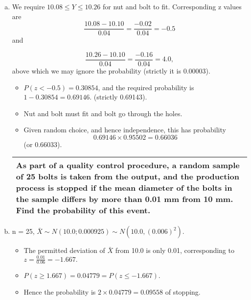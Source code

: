 \documentclass[a4paper,12pt]{article}
\begin{document}
\begin{enumerate}[(a)]
\begin{eqnarray*}
i.e. &=& P(z > \frac{-0.24}{0.12} ) \\
&=& P(z > -2:0) \\ 
&=& 0.97725.
\end{eqnarray*}
(a) Plates are independent, so required probability is (0.97725)2 = 0.95502.
\item We require $10.08 \leq Y \leq 10.26$ for nut and bolt to fit. Corresponding z values
are 
\[ \frac{10.08-10.10}{0.04} = \frac{ -0.02}{0.04} = -0.5 \]
and

\[ \frac{10.26-10.10}{0.04} = \frac{ -0.16}{0.04} = 4.0,\]
above which we
may ignore the probability (strictly it is 0.00003). 
\begin{itemize}
\item $P(z < -0.5) = 0.30854$,
and the required probability is $1 - 0.30854 = 0.69146.$ (strictly 0.69143).
\item Nut and bolt must fit and bolt go through the holes.
\item Given random choice,
and hence independence, this has probability \[0.69146 \times 0.95502 = 0.66036\]
(or 0.66033).
\end{itemize}

  \begin{table}[ht!]
     \centering
     \begin{tabular}{|p{15cm}|}
     \hline  
 As part of a quality control procedure, a random sample of 25 bolts is taken from the output, and the production process is stopped if the mean diameter of the bolts in the sample differs by more than 0.01 mm from 10 mm.  Find the probability of this event.
\\ \hline
      \end{tabular}
    \end{table}

\item n = 25, $\bar{X} \sim N(10.0; 0.0009
25 ) \sim N(10.0, (0.006)^2)$.
\begin{itemize}
\item The permitted deviation of $\bar{X}$ from 10.0 is only 0.01, corresponding to $z = \frac{0.01}{0.06} = -1.667.$

\item $P(z \geq 1.667) = 0.04779 = P(z \leq -1.667)$.
\item Hence the probability is $2 \times 0.04779 = 0.09558$ of stopping.
\end{itemize}
\end{enumerate}
\end{document}
